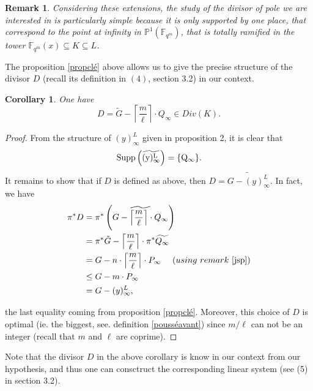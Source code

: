 \documentclass[10pt]{article}
\newtheorem{coro1}{Corollary}[]
\newtheorem{rq1}{Remark}[]
\newcommand{\s}{\vspace{0.3cm}}
\newcommand{\cd}{\cdot}
\newcommand{\fqm}{\mathbb{F}_{q^m}}
\newcommand{\su}{\subseteq}
\begin{document}
\s

\begin{rq1} \rm Considering these extensions, the study of the divisor of pole we are interested in is particularly simple because it is only supported by one place, that correspond to the point at infinity in $\mathbb{P}^1(\fqm)$, that is totally ramified in the tower $\fqm(x)\su K \su L$.
\end{rq1}

\s

The proposition \ref{propclé} above allows us to give the precise structure of the divisor $D$ (recall its definition in $(4)$, section 3.2) in our context.

\s

\begin{coro1} \label{diviseurDKummer}
One have
\[D = \tilde{G} - \left\lceil\frac{m}{\ell}\right\rceil \cd Q_{\infty} \in Div(K).\]
\end{coro1}

\s

\begin{proof}
From the structure of $(y)^L_{\infty}$ given in proposition 2, it is clear that 
\[\rm{Supp}\left(\widetilde{(y)^L_{\infty}}\right) = \{Q_{\infty}\}.\]
It remains to show that if $D$ is defined as above, then $D = \widetilde{G - (y)^L_{\infty}}$. In fact, we have
\begin{align*}
\pi^*D &= \pi^* \left(\widetilde{G - \left\lceil\frac{m}{\ell}\right\rceil \cd Q_{\infty}}\right) \\
&= \pi^*\tilde{G} - \left\lceil\frac{m}{\ell}\right\rceil \cd \pi^*\widetilde{Q_{\infty}} \\
&= G - n \cd \left\lceil\frac{m}{\ell}\right\rceil \cd P_{\infty} \ \quad (using \ remark \ \ref{jsp}) \\
& \leq G - m \cd P_{\infty} \\
&= G-(y)^L_{\infty},
\end{align*}

the last equality coming from proposition \ref{propclé}. Moreover, this choice of $D$ is optimal (ie. the biggest, see. definition \ref{pousséavant}) since $m/\ell$ can not be an integer (recall that $m$ and $\ell$ are coprime).
\end{proof}

\s

Note that the divisor $D$ in the above corollary is know in our context from our hypothesis, and thus one can consctruct the corresponding linear system (see (5) in section 3.2).
\end{document}
